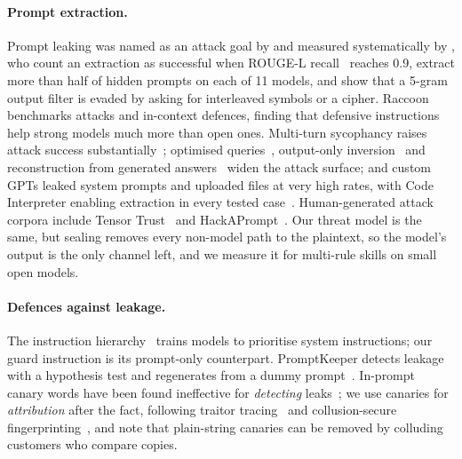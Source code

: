 \paragraph{Prompt extraction.}
Prompt leaking was named as an attack goal by \citet{perez2022ignore} and measured systematically by
\citet{zhang2024effective}, who count an extraction as successful when ROUGE-L
recall~\citep{lin2004rouge} reaches 0.9, extract more than half of hidden prompts on each of 11
models, and show that a 5-gram output filter is evaded by asking for interleaved symbols or a
cipher. Raccoon~\citep{wang2024raccoon} benchmarks attacks and in-context defences, finding that
defensive instructions help strong models much more than open ones. Multi-turn sycophancy raises
attack success substantially~\citep{agarwal2024prompt}; optimised queries~\citep{hui2024pleak},
output-only inversion~\citep{zhang2024extracting} and reconstruction from generated
answers~\citep{sha2024prompt} widen the attack surface; and custom GPTs leaked system prompts and
uploaded files at very high rates, with Code Interpreter enabling extraction in every tested
case~\citep{yu2023assessing}. Human-generated attack corpora include Tensor
Trust~\citep{toyer2024tensor} and HackAPrompt~\citep{schulhoff2023ignore}. Our threat model is the
same, but sealing removes every non-model path to the plaintext, so the model's output is the only
channel left, and we measure it for multi-rule skills on small open models.

\paragraph{Defences against leakage.}
The instruction hierarchy~\citep{wallace2024instruction} trains models to prioritise system
instructions; our guard instruction is its prompt-only counterpart. PromptKeeper detects leakage
with a hypothesis test and regenerates from a dummy prompt~\citep{jiang2025promptkeeper}. In-prompt
canary words have been found ineffective for \emph{detecting} leaks~\citep{gakh2025enhancing}; we use
canaries for \emph{attribution} after the fact, following traitor
tracing~\citep{chor1994tracing} and collusion-secure fingerprinting~\citep{boneh1998collusion}, and
note that plain-string canaries can be removed by colluding customers who compare copies.

